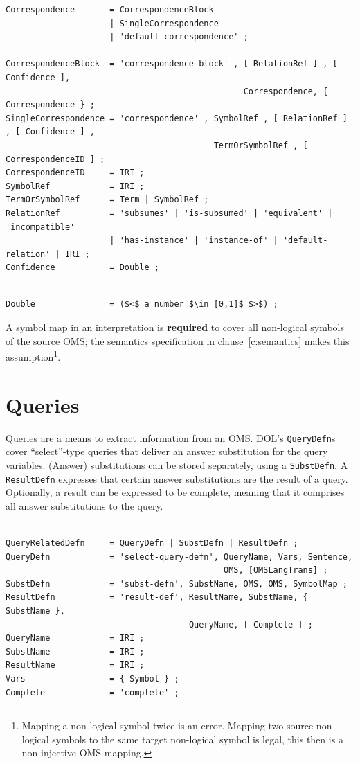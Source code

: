 \documentclass[10pt,fleqn,%
\ifpretendfinal
final%
\else
draft%
\fi,
]{scrreprt}
\newcommand{\red}[1]{#1} %
\newcommand*{\syntax}[1]{\texttt{#1}}
\newcommand*{\required}{\textbf{required}\xspace}
\newcommand{\clauserefname}{clause}
\newcommand{\cref}[1]{\clauserefname~\ref{#1}}
\newcommand{\sclause}[1]{\section{#1}}
\begin{document}
\begin{lstlisting}[language=ebnf,escapeinside={<>},mathescape]
Correspondence       = CorrespondenceBlock
                     | SingleCorrespondence
                     | 'default-correspondence' ; 

CorrespondenceBlock  = 'correspondence-block' , [ RelationRef ] , [ Confidence ],
                                                Correspondence, { Correspondence } ; 
SingleCorrespondence = 'correspondence' , SymbolRef , [ RelationRef ] , [ Confidence ] ,
                                          TermOrSymbolRef , [ CorrespondenceID ] ;
CorrespondenceID     = IRI ;
SymbolRef            = IRI ;
TermOrSymbolRef      = Term | SymbolRef ;
RelationRef          = 'subsumes' | 'is-subsumed' | 'equivalent' | 'incompatible' 
                     | 'has-instance' | 'instance-of' | 'default-relation' | IRI ; 
Confidence           = Double ;
\end{lstlisting}
\begin{lstlisting}[language=ebnf,escapeinside={()},mathescape]  % abstract syntax

Double               = ($<$ a number $\in [0,1]$ $>$) ;
\end{lstlisting}

A symbol map in an interpretation is \required to cover all non-logical symbols of the source OMS; 
the semantics specification in \cref{c:semantics} makes this assumption\footnote{Mapping a 
non-logical symbol twice is an error. Mapping two source non-logical symbols to the same target 
non-logical symbol is legal, this then is a non-injective OMS mapping.}. 


\sclause{Queries}
\red{
Queries are a means to extract information from an OMS.  DOL's \syntax{QueryDefn}s cover 
``select''-type queries that deliver an answer substitution for the query variables. (Answer) 
substitutions can be stored separately, using a \syntax{SubstDefn}. A
\syntax{ResultDefn} expresses that certain answer substitutions are
the result of a query. Optionally, a result can be expressed to be
complete, meaning that it comprises all answer substitutions to the query.
}
\begin{lstlisting}[language=ebnf,escapeinside={<>},mathescape]  % abstract syntax

QueryRelatedDefn     = QueryDefn | SubstDefn | ResultDefn ;
QueryDefn            = 'select-query-defn', QueryName, Vars, Sentence, 
                                            OMS, [OMSLangTrans] ;
SubstDefn            = 'subst-defn', SubstName, OMS, OMS, SymbolMap ;
ResultDefn           = 'result-def', ResultName, SubstName, { SubstName }, 
                                     QueryName, [ Complete ] ;
QueryName            = IRI ;
SubstName            = IRI ;
ResultName           = IRI ;
Vars                 = { Symbol } ;
Complete             = 'complete' ;
\end{lstlisting}
\end{document}
